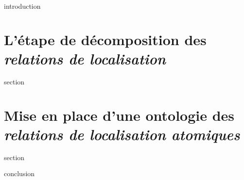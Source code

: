 %

\chaptertoc{}

\label{sec:5-int}
{introduction}

\section{L'étape de décomposition des \emph{relations de
    localisation}}
\label{sec:5-1}
{section}

\section{Mise en place d'une ontologie des \emph{relations de
    localisation atomiques}}
\label{sec:5-2}
{section}

\label{sec:5-cnc}
{conclusion}



